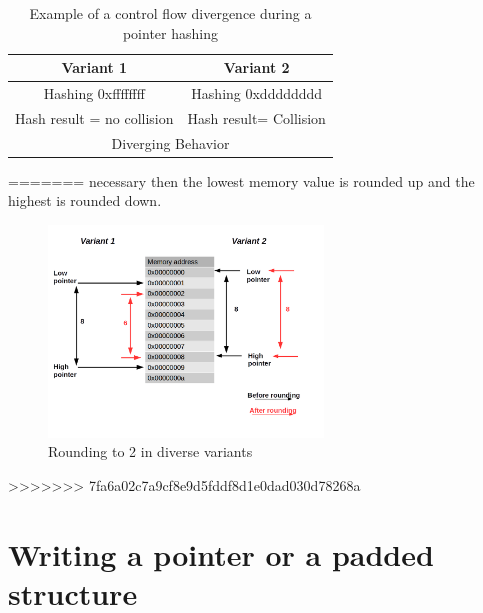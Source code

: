 \documentclass[english]{enstaPRE}
\begin{document}
\begin{table}[t]
 \centering
 \def\arraystretch{1.5}
 \begin{tabular}{c|c}
 Variant 1 & Variant 2 \\\hline
 Hashing 0xffffffff &  Hashing 0xdddddddd \\
 Hash result = no collision & Hash result= Collision \\
  \multicolumn{2}{c}{Diverging Behavior}\\
\end{tabular}
\caption{Example of a control flow divergence during a pointer hashing}
\label{tab:hashdiv}
\end{table}
=======
necessary then the lowest memory value is rounded up and the highest is rounded down.


\begin{figure}[t, centering]
 \centerline{\includegraphics[width=0.65\textwidth]{RoundUpMemory}}
 \caption{Rounding to 2 in diverse variants}
 \label{fig:rounding}
\end{figure}
>>>>>>> 7fa6a02c7a9cf8e9d5fddf8d1e0dad030d78268a


\section{Writing a pointer or a padded structure}
\end{document}

